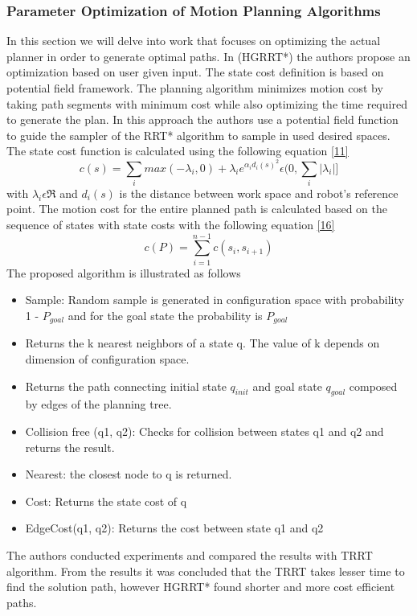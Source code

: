 \subsubsection{Parameter Optimization of Motion Planning Algorithms}
In this section we will delve into work that focuses on optimizing the actual planner in order to generate optimal paths. In \cite{11}(HGRRT*) the authors propose an optimization based on user given input. The state cost definition is based on potential field framework. The planning algorithm minimizes motion cost by taking path segments with minimum cost while also optimizing the time required to generate the plan. In this approach the authors use a potential field function to guide the sampler of the RRT* algorithm to sample in used desired spaces. The state cost function is calculated using the following equation \eqref{11}
\begin{equation}
\label{16}
c(s) = \sum_{i} max(-\lambda_{i},0 ) + \lambda_{i}e^{\alpha_{i}d_{i}(s)^2} \epsilon (0,\sum_{i}|\lambda_{i}|]
\end{equation}
with $\lambda_{i} \epsilon \Re$ and $d_{i}(s)$ is the distance between work space and robot's reference point. The motion cost for the entire planned path is calculated based on the sequence of states with state costs with the following equation \eqref{16}
\begin{equation}
\label{17}
c(P) = \sum_{i=1}^{n-1}c(s_{i},s_{i+1})
\end{equation}
The proposed algorithm is illustrated as follows
\begin{itemize}
\item Sample: Random sample is generated in configuration space with probability 1 - $P_{goal}$ and for the goal state the probability is $P_{goal}$
\item Returns the k nearest neighbors of a state q. The value of k depends on dimension of configuration space.
\item Returns the path connecting initial state $q_{init}$ and goal state $q_{goal}$ composed by edges of the planning tree.
\item Collision free (q1, q2): Checks for collision between states q1 and q2 and returns the result.
\item Nearest: the closest node to q is returned. 
\item Cost: Returns the state cost of q
\item EdgeCost(q1, q2): Returns the cost between state q1 and q2
\end{itemize}
The authors conducted experiments and compared the results with TRRT algorithm. From the results it was concluded that the TRRT takes lesser time to find the solution path, however HGRRT* found shorter and more cost efficient paths. 
\newpage
